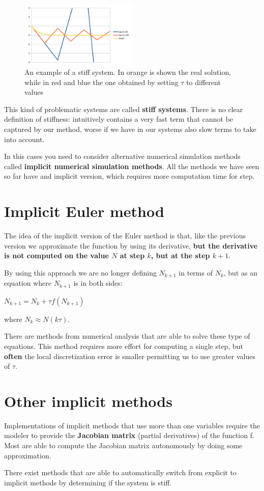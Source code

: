 \begin{figure}[h]
    \centering
    \includegraphics[width=0.5\textwidth]{Images/03 - Contiguous Dynamicsl System/Stiff System.png}
    \caption{An example of a stiff system. In orange is shown the real solution, while in red and blue the one obtained by setting $\tau$ to different values} 
\end{figure}

This kind of problematic systems are called \textbf{stiff systems}. There is no clear definition of stiffness: intuitively contains a very fast term that cannot be captured by our method, worse if we have in our systems also slow terms to take into account. \par
In this cases you need to consider alternative numerical simulation methods called \textbf{implicit numerical simulation methods}. All the methods we have seen so far have and implicit version, which requires more computation time for step.

\section{Implicit Euler method}
The idea of the implicit version of the Euler method is that, like the previous version we approximate the function by using its derivative, \textbf{but the derivative is not computed on the value $N$ at step $k$, but at the step $k+1$}.\par
By using this approach we are no longer defining $N_{k+1}$ in terms of $N_k$, but as an equation where $N_{k+1}$ is in both sides:

\begin{center}
    $N_{k+1} = N_{k} + \tau f (N_{k+1})$
\end{center}
where $N_k \approx N(k \tau)$.\par

There are methods from numerical analysis that are able to solve these type of equations. This method requires more effort for computing a single step, but \textbf{often} the local discretization error is smaller permitting us to use greater values of $\tau$.

\section{Other implicit methods}
Implementations of implicit methods that use more than one variables require the modeler to provide the \textbf{Jacobian matrix} (partial derivatives) of the function f. Most are able to compute the Jacobian matrix autonomously by doing some approximation. \par
There exist methods that are able to automatically switch from explicit to implicit methods by determining if the system is stiff.




